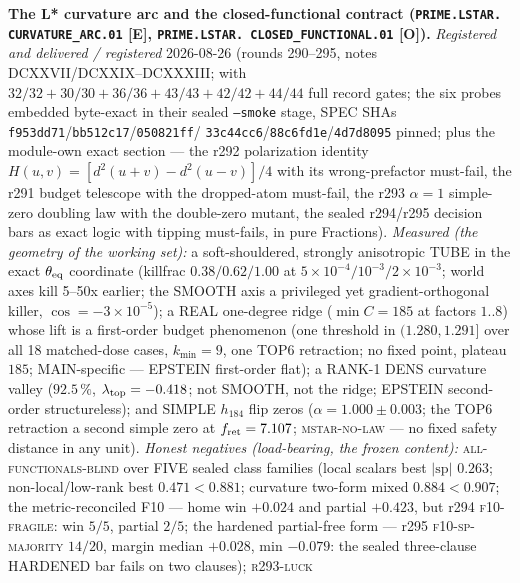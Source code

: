 \par\smallskip\noindent\textbf{The L* curvature arc and the
closed-functional contract (\texttt{PRIME.LSTAR.\allowbreak
CURVATURE\_ARC.01} [E], \texttt{PRIME.LSTAR.\allowbreak
CLOSED\_FUNCTIONAL.01} [O]).}
{\sloppy
\emph{Registered and delivered / registered} 2026-08-26 (rounds
290--295, notes DCXXVII/DCXXIX--DCXXXIII;
 with $32/32 + 30/30 + 36/36 +
43/43 + 42/42 + 44/44$ full record gates; the six probes embedded
byte-exact in their sealed \texttt{--smoke} stage, SPEC SHAs
\texttt{f953dd71}/\texttt{bb512c17}/\texttt{050821ff}/%
\texttt{33c44cc6}/\texttt{88c6fd1e}/\texttt{4d7d8095} pinned; plus
the module-own exact section --- the r292 polarization identity
$H(u,v) = [d^2(u{+}v) - d^2(u{-}v)]/4$ with its wrong-prefactor
must-fail, the r291 budget telescope with the dropped-atom
must-fail, the r293 $\alpha = 1$ simple-zero doubling law with the
double-zero mutant, the sealed r294/r295 decision bars as exact
logic with tipping must-fails, in pure Fractions).  \emph{Measured
(the geometry of the working set):} a soft-shouldered, strongly
anisotropic TUBE in the exact $\theta_{\rm eq}$ coordinate
(killfrac $0.38/0.62/1.00$ at $5\times10^{-4}/10^{-3}/
2\times10^{-3}$; world axes kill 5--50x earlier; the SMOOTH axis a
privileged yet gradient-orthogonal killer, $\cos =
-3\times10^{-5}$); a REAL one-degree ridge ($\min C = 185$ at
factors $1..8$) whose lift is a first-order budget phenomenon (one
threshold in $(1.280, 1.291]$ over all 18 matched-dose cases,
$k_{\min} = 9$, one TOP6 retraction; no fixed point, plateau $185$;
MAIN-specific --- EPSTEIN first-order flat); a RANK-1 DENS
curvature valley ($92.5\,\%$, $\lambda_{\rm top} = -0.418$; not
SMOOTH, not the ridge; EPSTEIN second-order structureless); and
SIMPLE $h_{184}$ flip zeros ($\alpha = 1.000 \pm 0.003$; the TOP6
retraction a second simple zero at $f_{\rm ret} = 7.107$;
\textsc{mstar-no-law} --- no fixed safety distance in any unit).
\emph{Honest negatives (load-bearing, the frozen content):}
\textsc{all-functionals-blind} over FIVE sealed class families
(local scalars best $|\mathrm{sp}|$ $0.263$; non-local/low-rank
best $0.471 < 0.881$; curvature two-form mixed $0.884 < 0.907$;
the metric-reconciled F10 --- home win $+0.024$ and partial
$+0.423$, but r294 \textsc{f10-fragile}: win $5/5$, partial $2/5$;
the hardened partial-free form --- r295 \textsc{f10-sp-majority}
$14/20$, margin median $+0.028$, min $-0.079$: the sealed
three-clause HARDENED bar fails on two clauses); \textsc{r293-luck}
}
